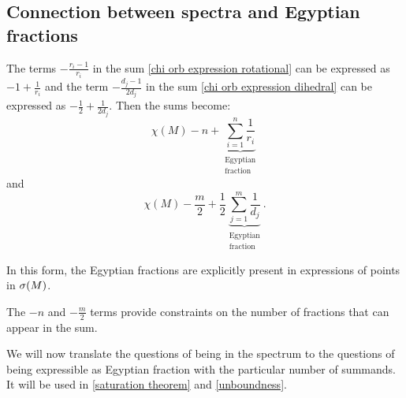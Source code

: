 \subsection{Connection between spectra and Egyptian fractions}\label{Egyptian_fractions}
The terms $-\frac{r_i-1}{r_i}$ in the sum \ref{chi orb expression rotational} 
can be expressed as $-1+ \frac{1}{r_i}$ 
and the term $-\frac{d_j-1}{2d_j}$ in the sum \ref{chi orb expression dihedral} can be expressed as 
$-\frac{1}{2} + \frac{1}{2d_j}$. 
Then the sums become:
\begin{equation}\label{Egyptian S2 sum}
\chi(M) - n + \underbrace{\sum_{i=1}^n \frac{1}{r_i}}_{
\substack{\textrm{Egyptian} \\ \textrm{fraction}}}
\end{equation}
and
\begin{equation}\label{Egyptian D2 sum}
\chi(M) - \frac{m}{2} + \frac{1}{2}
\underbrace{\sum_{j=1}^m \frac{1}{d_j}}_{
\substack{\textrm{Egyptian} \\\textrm{fraction}}}.
\end{equation}

In this form, the Egyptian fractions are explicitly present in expressions of 
points in ${{\sigma}(M)}$.

The $-n$ and $-\frac{m}{2}$ terms provide constraints on the number of fractions that 
can appear in the sum.

We will now translate the questions of being in the spectrum 
to the questions of being expressible as Egyptian fraction with the particular number 
of summands. It will be used in \ref{saturation theorem} and \ref{unboundness}.

